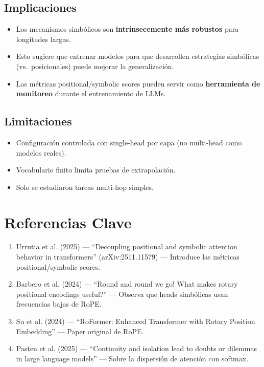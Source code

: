 \documentclass[conference]{IEEEtran}
\begin{document}
\subsection{Implicaciones}

\begin{itemize}
    \item Los mecanismos simb\'olicos son \textbf{intr\'insecemente m\'as robustos} para longitudes largas.
    \item Esto sugiere que entrenar modelos para que desarrollen estrategias simb\'olicas (vs.~posicionales) puede mejorar la generalizaci\'on.
    \item Las m\'etricas positional/symbolic scores pueden servir como \textbf{herramienta de monitoreo} durante el entrenamiento de LLMs.
\end{itemize}

\subsection{Limitaciones}

\begin{itemize}
    \item Configuraci\'on controlada con single-head por capa (no multi-head como modelos reales).
    \item Vocabulario finito limita pruebas de extrapolaci\'on.
    \item Solo se estudiaron tareas multi-hop simples.
\end{itemize}

\section*{Referencias Clave}

\begin{enumerate}
    \item Urrutia et al. (2025) --- ``Decoupling positional and symbolic attention behavior in transformers'' (arXiv:2511.11579) --- Introduce las m\'etricas positional/symbolic scores.
    \item Barbero et al. (2024) --- ``Round and round we go! What makes rotary positional encodings useful?'' --- Observa que heads simb\'olicas usan frecuencias bajas de RoPE.
    \item Su et al. (2024) --- ``RoFormer: Enhanced Transformer with Rotary Position Embedding'' --- Paper original de RoPE.
    \item Pasten et al. (2025) --- ``Continuity and isolation lead to doubts or dilemmas in large language models'' --- Sobre la dispersi\'on de atenci\'on con softmax.
\end{enumerate}
\end{document}
